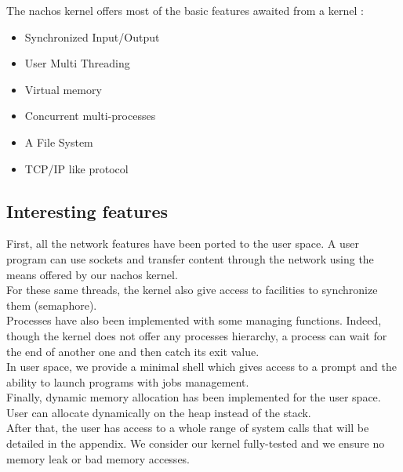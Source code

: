 The nachos kernel offers most of the basic features awaited from a kernel :\\
\begin{itemize}
\item Synchronized Input/Output
\item User Multi Threading
\item Virtual memory
\item Concurrent multi-processes
\item A File System
\item TCP/IP like protocol
\end{itemize}

\subsection{Interesting features}

First, all the network features have been ported to the user space. A user
program can use sockets and transfer content through the network using the
means offered by our nachos kernel.\\

For these same threads, the kernel also give access to facilities to
synchronize them (semaphore).\\

Processes have also been implemented with some managing functions. Indeed,
though the kernel does not offer any processes hierarchy, a process can wait
for the end of another one and then catch its exit value.\\

In user space, we provide a minimal shell which gives access to a prompt and
the ability to launch programs with jobs management.\\

Finally, dynamic memory allocation has been implemented for the user space.
User can allocate dynamically on the heap instead of the stack.\\

After that, the user has access to a whole range of system calls that will be
detailed in the appendix. We consider our kernel fully-tested and we ensure no
memory leak or bad memory accesses.
